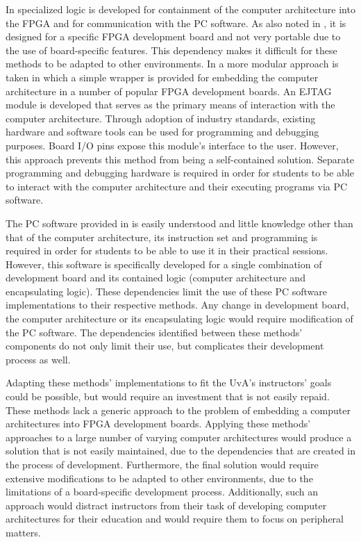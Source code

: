 \documentclass[openright]{template/uva-bachelor-thesis}
\begin{document}
In \cite{holland2003harnessing, bulic2013fpga} specialized logic is developed for containment of the computer architecture into the FPGA and for communication with the PC software. As also noted in \cite{bulic2013fpga}, it is designed for a specific FPGA development board and not very portable due to the use of board-specific features. This dependency makes it difficult for these methods to be adapted to other environments. In \cite{mipsfpga} a more modular approach is taken in which a simple wrapper is provided for embedding the computer architecture in a number of popular FPGA development boards. An EJTAG module is developed that serves as the primary means of interaction with the computer architecture. Through adoption of industry standards, existing hardware and software tools can be used for programming and debugging purposes. Board I/O pins expose this module's interface to the user. However, this approach prevents this method from being a self-contained solution. Separate programming and debugging hardware is required in order for students to be able to interact with the computer architecture and their executing programs via PC software. 

The PC software provided in \cite{holland2003harnessing, bulic2013fpga} is easily understood and little knowledge other than that of the computer architecture, its instruction set and programming is required in order for students to be able to use it in their practical sessions. However, this software is specifically developed for a single combination of development board and its contained logic (computer architecture and encapsulating logic). These dependencies limit the use of these PC software implementations to their respective methods. Any change in development board, the computer architecture or its encapsulating logic would require modification of the PC software. The dependencies identified between these methods' components do not only limit their use, but complicates their development process as well. 

Adapting these methods' implementations to fit the UvA's instructors' goals could be possible, but would require an investment that is not easily repaid. These methods lack a generic approach to the problem of embedding a computer architectures into FPGA development boards. Applying these methods' approaches to a large number of varying computer architectures would produce a solution that is not easily maintained, due to the dependencies that are created in the process of development. Furthermore, the final solution would require extensive modifications to be adapted to other environments, due to the limitations of a board-specific development process. Additionally, such an approach would distract instructors from their task of developing computer architectures for their education and would require them to focus on peripheral matters. 
\end{document}

